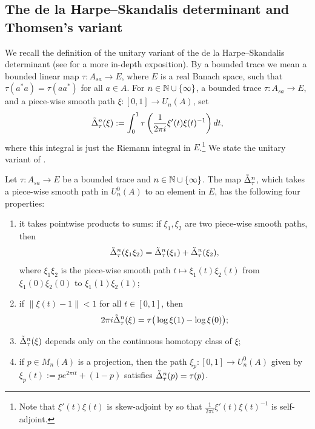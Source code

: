 \documentclass[12pt]{amsart}
\begin{document}
\subsection{The de la Harpe--Skandalis determinant and Thomsen's variant}\label{section:dlHS-det}

We recall the definition of the unitary variant of the de la Harpe--Skandalis determinant \cite{dlHS84a} (see \cite{dlHarpe13} for a more in-depth exposition). By a bounded trace we mean a bounded linear map $\tau: A_{sa} \to E$, where $E$ is a real Banach space, such that $\tau(a^*a) = \tau(aa^*)$ for all $a \in A$. For $n \in \mathbb{N} \cup \{\infty\}$, a bounded trace $\tau: A_{sa} \to E$, and a piece-wise smooth path $\xi: [0,1] \to U_n(A)$, set
\begin{equation} 
\label{eq:predetDefn}
\tilde{\Delta}_\tau^n(\xi) := \int_0^1 \tau\left(\frac{1}{2\pi i}\xi'(t)\xi(t)^{-1}\right)dt,
\end{equation}
where this integral is just the Riemann integral in $E$.\footnote{Note that $\xi'(t)\xi(t)$ is skew-adjoint by \cite[Proposition 1.4]{Phillips92} so that $\frac{1}{2\pi i}\xi'(t)\xi(t)^{-1}$ is self-adjoint.}
 We state the unitary variant of \cite[Lemme 1]{dlHS84a}.

\begin{prop}\label{prop:detFacts}
Let $\tau: A_{sa} \to E$ be a bounded trace and $n \in \mathbb{N} \cup \{\infty\}$. The map $\tilde{\Delta}_\tau^n$, which takes a piece-wise smooth path in $U_n^0(A)$ to an element in $E$, has the following four properties:
  \begin{enumerate}
    \item it takes pointwise products to sums: if $\xi_1,\xi_2$ are two piece-wise smooth paths, then
    \begin{equation} \tilde{\Delta}_\tau^n(\xi_1\xi_2) = \tilde{\Delta}_\tau^n(\xi_1) + \tilde{\Delta}_\tau^n(\xi_2), \end{equation}
    where $\xi_1\xi_2$ is the piece-wise smooth path $t \mapsto \xi_1(t)\xi_2(t)$ from $\xi_1(0)\xi_2(0)$ to $\xi_1(1)\xi_2(1)$;
  \item if $\|\xi(t) - 1\| < 1$ for all $t \in [0,1]$, then \begin{equation} 2\pi i \tilde{\Delta}_\tau^n(\xi) = \tau\big(\log\xi(1) - \log\xi(0)\big); \end{equation}
    \item $\tilde{\Delta}_\tau^n(\xi)$ depends only on the continuous homotopy class of $\xi$;
    \item if $p \in M_n(A)$ is a projection, then the path $\xi_p: [0,1] \to U_n^0(A)$ given by $\xi_p(t) := pe^{2\pi i t} + (1-p)$ satisfies $\tilde{\Delta}_\tau^n(p) = \tau(p)$. \label{predetprojection}
  \end{enumerate}
\end{prop}
\end{document}

